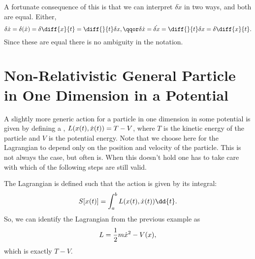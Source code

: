 A fortunate consequence of this is that we can interpret \(\delta \dot{x}\) in two ways, and both are equal.
Either,
\begin{equation}
    \delta \dot{x} = \delta (\dot{x}) = \delta \diff{x}{t} = \diff{}{t}\delta x, \qqor \delta \dot{x} = \dot{\delta x} = \diff{}{t} \delta x = \delta \diff{x}{t}.
\end{equation}
Since these are equal there is no ambiguity in the notation.

\section[Non-Relativistic General Particle in One Dimension in a Potential][Second Example]{Non-Relativistic General Particle in One Dimension in a Potential}
A slightly more generic action for a particle in one dimension in some potential is given by defining a , \(L(x(t), \dot{x}(t)) = T - V\), where \(T\) is the kinetic energy of the particle and \(V\) is the potential energy.
Note that we choose here for the Lagrangian to depend only on the position and velocity of the particle.
This is not always the case, but often is.
When this doesn't hold one has to take care with which of the following steps are still valid.

The Lagrangian is defined such that the action is given by its integral:
\begin{equation}
    S[x(t)] = \int_a^b \lagrangian(x(t), \dot{x}(t)) \dd{t}.
\end{equation}
So, we can identify the Lagrangian from the previous example as
\begin{equation}
    L = \frac{1}{2}m\dot{x}^2 - V(x),
\end{equation}
which is exactly \(T - V\).

